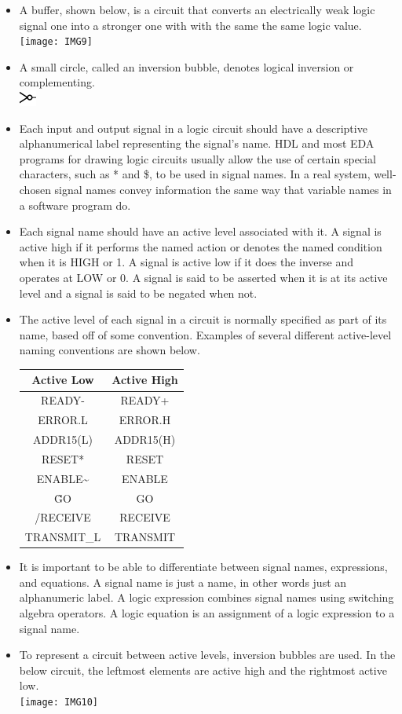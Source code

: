 \documentclass[10pt,a4paper]{article}
\begin{document}
\begin{itemize}
\item A buffer, shown below, is a circuit that converts an electrically weak logic signal one into a stronger one with with the same the same logic value.
\texttt{[image: IMG9]}
\item A small circle, called an inversion bubble, denotes logical inversion or complementing. \\
\includegraphics[scale=5]{IMG2}
\item Each input and output signal in a logic circuit should have a descriptive alphanumerical label representing the signal's name. HDL and most EDA programs for drawing logic circuits usually allow the use of certain special characters, such as * and \$, to be used in signal names. In a real system, well-chosen signal names convey information the same way that variable names in a software program do. 
\item Each signal name should have an active level associated with it. A signal is active high if it performs the named action or denotes the named condition when it is HIGH or 1. A signal is active low if it does the inverse and operates at LOW or 0. A signal is said to be asserted when it is at its active level and a signal is said to be negated when not. 
\item The active level of each signal in a circuit is normally specified as part of its name, based off of some convention. Examples of several different active-level naming conventions are shown below.\\
\begin{tabular}{|c|c|}
\hline 
\textbf{Active Low} & \textbf{Active High} \\ 
\hline 
READY- & READY+ \\ 
\hline 
ERROR.L & ERROR.H \\ 
\hline 
ADDR15(L) & ADDR15(H) \\ 
\hline 
RESET* & RESET \\ 
\hline 
ENABLE\~ & ENABLE \\ 
\hline 
\~GO & GO \\ 
\hline 
/RECEIVE & RECEIVE \\ 
\hline 
TRANSMIT\_L & TRANSMIT \\ 
\hline 
\end{tabular}
\item It is important to be able to differentiate between signal names, expressions, and equations. A signal name is just a name, in other words just an alphanumeric label. A logic expression combines signal names using switching algebra operators. A logic equation is an assignment of a logic expression to a signal name. 
\item To represent a circuit between active levels, inversion bubbles are used. In the below circuit, the leftmost elements are active high and the rightmost active low.\\
\texttt{[image: IMG10]}
\end{itemize}
\end{document}
